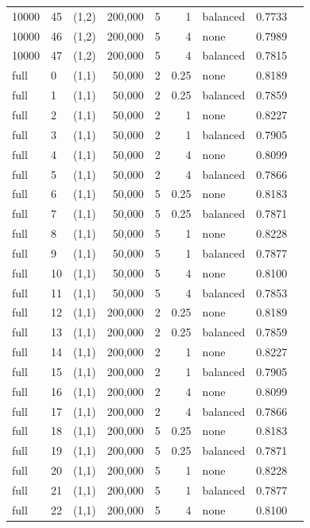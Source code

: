 \documentclass[10pt,a4paper]{article}
\begin{document}
{\begin{longtable}{@{}llrrrrlrl@{}}
10000 & 45 & (1,2) & 200,000 & 5 & 1 & balanced & 0.7733 &  \\
10000 & 46 & (1,2) & 200,000 & 5 & 4 & none & 0.7989 &  \\
10000 & 47 & (1,2) & 200,000 & 5 & 4 & balanced & 0.7815 &  \\
full & 0 & (1,1) & 50,000 & 2 & 0.25 & none & 0.8189 &  \\
full & 1 & (1,1) & 50,000 & 2 & 0.25 & balanced & 0.7859 &  \\
full & 2 & (1,1) & 50,000 & 2 & 1 & none & 0.8227 &  \\
full & 3 & (1,1) & 50,000 & 2 & 1 & balanced & 0.7905 &  \\
full & 4 & (1,1) & 50,000 & 2 & 4 & none & 0.8099 &  \\
full & 5 & (1,1) & 50,000 & 2 & 4 & balanced & 0.7866 &  \\
full & 6 & (1,1) & 50,000 & 5 & 0.25 & none & 0.8183 &  \\
full & 7 & (1,1) & 50,000 & 5 & 0.25 & balanced & 0.7871 &  \\
full & 8 & (1,1) & 50,000 & 5 & 1 & none & 0.8228 &  \\
full & 9 & (1,1) & 50,000 & 5 & 1 & balanced & 0.7877 &  \\
full & 10 & (1,1) & 50,000 & 5 & 4 & none & 0.8100 &  \\
full & 11 & (1,1) & 50,000 & 5 & 4 & balanced & 0.7853 &  \\
full & 12 & (1,1) & 200,000 & 2 & 0.25 & none & 0.8189 &  \\
full & 13 & (1,1) & 200,000 & 2 & 0.25 & balanced & 0.7859 &  \\
full & 14 & (1,1) & 200,000 & 2 & 1 & none & 0.8227 &  \\
full & 15 & (1,1) & 200,000 & 2 & 1 & balanced & 0.7905 &  \\
full & 16 & (1,1) & 200,000 & 2 & 4 & none & 0.8099 &  \\
full & 17 & (1,1) & 200,000 & 2 & 4 & balanced & 0.7866 &  \\
full & 18 & (1,1) & 200,000 & 5 & 0.25 & none & 0.8183 &  \\
full & 19 & (1,1) & 200,000 & 5 & 0.25 & balanced & 0.7871 &  \\
full & 20 & (1,1) & 200,000 & 5 & 1 & none & 0.8228 &  \\
full & 21 & (1,1) & 200,000 & 5 & 1 & balanced & 0.7877 &  \\
full & 22 & (1,1) & 200,000 & 5 & 4 & none & 0.8100 &  \\

\end{longtable}}
\end{document}
